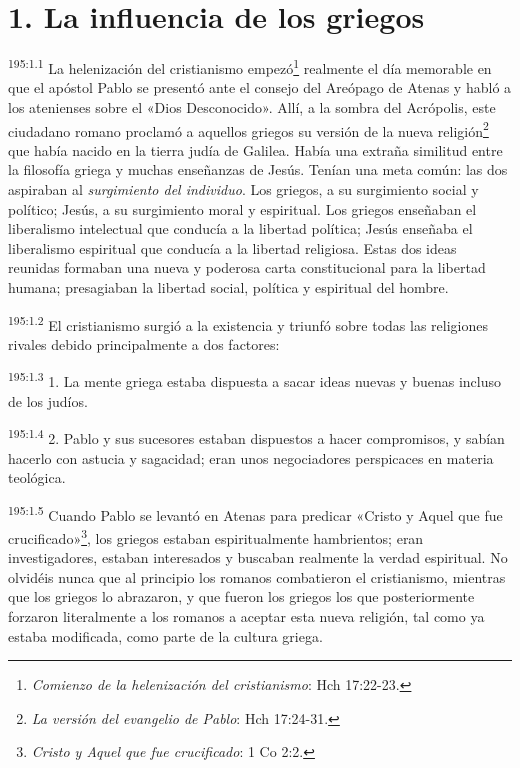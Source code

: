 \section*{1. La influencia de los griegos}
\par
\textsuperscript{195:1.1} La helenización del cristianismo empezó\footnote{\textit{Comienzo de la helenización del cristianismo}: Hch 17:22-23.} realmente el día memorable en que el apóstol Pablo se presentó ante el consejo del Areópago de Atenas y habló a los atenienses sobre el «Dios Desconocido». Allí, a la sombra del Acrópolis, este ciudadano romano proclamó a aquellos griegos su versión de la nueva religión\footnote{\textit{La versión del evangelio de Pablo}: Hch 17:24-31.} que había nacido en la tierra judía de Galilea. Había una extraña similitud entre la filosofía griega y muchas enseñanzas de Jesús. Tenían una meta común: las dos aspiraban al \textit{surgimiento del individuo}. Los griegos, a su surgimiento social y político; Jesús, a su surgimiento moral y espiritual. Los griegos enseñaban el liberalismo intelectual que conducía a la libertad política; Jesús enseñaba el liberalismo espiritual que conducía a la libertad religiosa. Estas dos ideas reunidas formaban una nueva y poderosa carta constitucional para la libertad humana; presagiaban la libertad social, política y espiritual del hombre.

\par
\textsuperscript{195:1.2} El cristianismo surgió a la existencia y triunfó sobre todas las religiones rivales debido principalmente a dos factores:

\par
\textsuperscript{195:1.3} 1. La mente griega estaba dispuesta a sacar ideas nuevas y buenas incluso de los judíos.

\par
\textsuperscript{195:1.4} 2. Pablo y sus sucesores estaban dispuestos a hacer compromisos, y sabían hacerlo con astucia y sagacidad; eran unos negociadores perspicaces en materia teológica.

\par
\textsuperscript{195:1.5} Cuando Pablo se levantó en Atenas para predicar «Cristo y Aquel que fue crucificado»\footnote{\textit{Cristo y Aquel que fue crucificado}: 1 Co 2:2.}, los griegos estaban espiritualmente hambrientos; eran investigadores, estaban interesados y buscaban realmente la verdad espiritual. No olvidéis nunca que al principio los romanos combatieron el cristianismo, mientras que los griegos lo abrazaron, y que fueron los griegos los que posteriormente forzaron literalmente a los romanos a aceptar esta nueva religión, tal como ya estaba modificada, como parte de la cultura griega.

